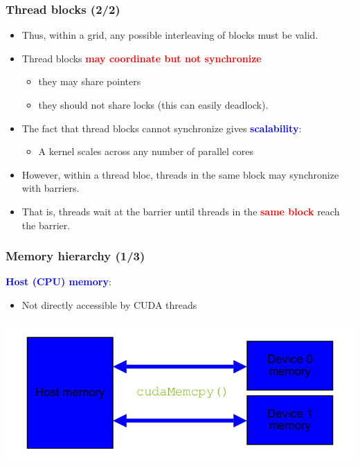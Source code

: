 \begin{frame}[fragile]
\frametitle{Thread blocks (2/2)}

\begin{itemize}
\item Thus, within a grid, any possible interleaving of 
       blocks must be valid.
\medskip
\item Thread blocks  \textcolor{red}{\bf may coordinate but not synchronize}
\begin{itemize}
\item they may share pointers
\item they should not share locks (this can easily deadlock).
\end{itemize}
\medskip
\item The fact that thread blocks cannot synchronize
     gives \textcolor{blue}{\bf scalability}:
\begin{itemize}
\item A kernel scales across any number of parallel cores
\end{itemize}
\medskip
\item However, within a thread bloc,  
    threads in the same block may synchronize with barriers.
\item That is, threads wait at the barrier until threads 
     in the  \textcolor{red}{\bf same block} reach the barrier.
\end{itemize}

\end{frame}
\begin{frame}[fragile]
\frametitle{Memory hierarchy (1/3)}

\textcolor{blue}{\bf Host (CPU) memory}:
\begin{itemize}
\item Not directly accessible by CUDA threads
\end{itemize}

\begin{center}
\includegraphics[scale=0.6]{images/15.png}
\end{center}
\end{frame}
